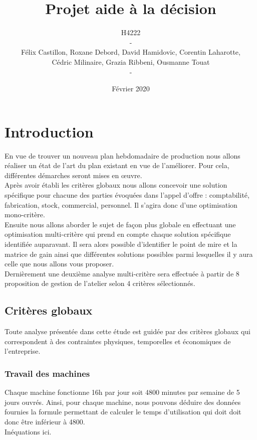 \documentclass{article}
\title{{\Huge Projet aide à la décision}}
\author{{\Large
H4222}\\
-
\\
Félix Castillon, Roxane Debord, David Hamidovic, Corentin Laharotte,\\
Cédric Milinaire, Grazia Ribbeni, Ousmanne Touat\\
-}
\date{Février 2020}
\begin{document}
\maketitle
\thispagestyle{empty}

\section{Introduction}
En vue de trouver un nouveau plan hebdomadaire de production nous allons réaliser un état de l’art du plan existant en vue de l’améliorer. Pour cela, différentes démarches seront mises en œuvre.\\

Après avoir établi les critères globaux nous allons concevoir une solution spécifique pour chacune des parties évoquées dans l’appel d’offre : comptabilité, fabrication, stock, commercial, personnel. Il s'agira donc d'une optimisation mono-critère.\\
Ensuite nous allons aborder le sujet de façon plus globale en effectuant une optimisation multi-critère qui prend en compte chaque solution spécifique identifiée auparavant. Il sera alors possible d'identifier le point de mire et la matrice de gain ainsi que différentes solutions possibles parmi lesquelles il y aura celle que nous allons vous proposer.\\
Dernièrement une deuxième analyse multi-critère sera effectuée à partir de 8 proposition de gestion de l'atelier selon 4 critères sélectionnés.

\subsection{Critères globaux}
Toute analyse présentée dans cette étude est guidée par des critères globaux qui correspondent à des contraintes physiques, temporelles et économiques de l'entreprise.\\

\subsubsection{Travail des machines}
Chaque machine fonctionne 16h par jour soit 4800 minutes par semaine de 5 jours ouvrés.
Ainsi, pour chaque machine, nous pouvons déduire des données fournies la formule permettant de calculer le temps d'utilisation qui doit doit donc être inférieur à 4800.\\

Inéquations ici.
\end{document}

